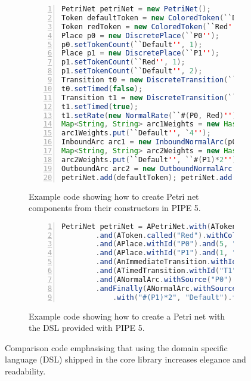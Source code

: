\begin{figure}[tb]
\centering
\begin{subfigure}[b]{\linewidth}
\vspace{0.5cm}
\begin{lstlisting}[numbers=left, language=Java, frame=single]
PetriNet petriNet = new PetriNet();
Token defaultToken = new ColoredToken(``Default'', Color.BLACK);
Token redToken = new ColoredToken(``Red'', Color.RED);
Place p0 = new DiscretePlace(``P0'');
p0.setTokenCount(``Default'', 1);
Place p1 = new DiscretePlace(``P1'');
p1.setTokenCount(``Red'', 1);
p1.setTokenCount(``Default'', 2);
Transition t0 = new DiscreteTransition(``T0'');
t0.setTimed(false);
Transition t1 = new DiscreteTransition(``T1'');
t1.setTimed(true);
t1.setRate(new NormalRate(``#(P0, Red)''));
Map<String, String> arc1Weights = new HashMap<>();
arc1Weights.put(``Default'', `4'');
InboundArc arc1 = new InboundNormalArc(p0, t0, arc1Weights);
Map<String, String> arc2Weights = new HashMap<>();
arc2Weights.put(``Default'', ``#(P1)*2'');
OutboundArc arc2 = new OutboundNormalArc(t0, p0, arc2Weights);
petriNet.add(defaultToken); petriNet.add(redToken); petriNet.add(p0); petriNet.add(p1); petriNet.add(t0); petriNet.add(t1); petriNet.add(arc1); petriNet.add(arc2);
\end{lstlisting}
\caption{Example code showing how to create Petri net components from their constructors in PIPE 5.}
\end{subfigure}

\begin{subfigure}[b]{\linewidth}
\vspace{0.5cm}
\begin{lstlisting}[numbers=left,language=Java,frame=single]
PetriNet petriNet = APetriNet.with(AToken.called("Default").withColor(Color.BLACK))
        .and(AToken.called("Red").withColor(Color.RED))
        .and(APlace.withId("P0").and(5, "Default").tokens())
        .and(APlace.withId("P1").and(1, "Red").and(2, "Default").to())
        .and(AnImmediateTransition.withId("T0"))
        .and(ATimedTransition.withId("T1").andRate("#(P0, Red)"))
        .and(ANormalArc.withSource("P0").andTarget("T0").and("4", "Default").tokens())
        .andFinally(ANormalArc.withSource("T0").andTarget("P0")
            .with("#(P1)*2", "Default").tokens());
\end{lstlisting}
\caption{Example code showing how to create a Petri net with the DSL provided with PIPE 5.}
\end{subfigure}


\caption{Comparison code emphasising that using the domain specific language (DSL) shipped in the core library increases elegance and readability.}
\label{lst:dsl}
\end{figure}

